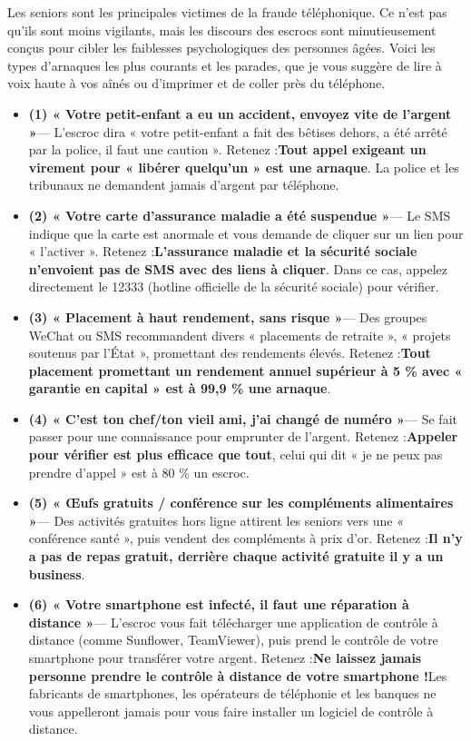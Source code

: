 
Les seniors sont les principales victimes de la fraude téléphonique. Ce n'est pas qu'ils sont moins vigilants, mais les discours des escrocs sont minutieusement conçus pour cibler les faiblesses psychologiques des personnes âgées. Voici les types d'arnaques les plus courants et les parades, que je vous suggère de lire à voix haute à vos aînés ou d'imprimer et de coller près du téléphone.


\begin{itemize}
  \item \textbf{(1) « Votre petit-enfant a eu un accident, envoyez vite de l'argent »}— L'escroc dira « votre petit-enfant a fait des bêtises dehors, a été arrêté par la police, il faut une caution ». Retenez :\textbf{Tout appel exigeant un virement pour « libérer quelqu'un » est une arnaque}. La police et les tribunaux ne demandent jamais d'argent par téléphone.
  \item \textbf{(2) « Votre carte d'assurance maladie a été suspendue »}— Le SMS indique que la carte est anormale et vous demande de cliquer sur un lien pour « l'activer ». Retenez :\textbf{L'assurance maladie et la sécurité sociale n'envoient pas de SMS avec des liens à cliquer}. Dans ce cas, appelez directement le 12333 (hotline officielle de la sécurité sociale) pour vérifier.
  \item \textbf{(3) « Placement à haut rendement, sans risque »}— Des groupes WeChat ou SMS recommandent divers « placements de retraite », « projets soutenus par l'État », promettant des rendements élevés. Retenez :\textbf{Tout placement promettant un rendement annuel supérieur à 5 \% avec « garantie en capital » est à 99,9 \% une arnaque}.
  \item \textbf{(4) « C'est ton chef/ton vieil ami, j'ai changé de numéro »}— Se fait passer pour une connaissance pour emprunter de l'argent. Retenez :\textbf{Appeler pour vérifier est plus efficace que tout}, celui qui dit « je ne peux pas prendre d'appel » est à 80 \% un escroc.
  \item \textbf{(5) « Œufs gratuits / conférence sur les compléments alimentaires »}— Des activités gratuites hors ligne attirent les seniors vers une « conférence santé », puis vendent des compléments à prix d'or. Retenez :\textbf{Il n'y a pas de repas gratuit, derrière chaque activité gratuite il y a un business}.
  \item \textbf{(6) « Votre smartphone est infecté, il faut une réparation à distance »}— L'escroc vous fait télécharger une application de contrôle à distance (comme Sunflower, TeamViewer), puis prend le contrôle de votre smartphone pour transférer votre argent. Retenez :\textbf{Ne laissez jamais personne prendre le contrôle à distance de votre smartphone !}Les fabricants de smartphones, les opérateurs de téléphonie et les banques ne vous appelleront jamais pour vous faire installer un logiciel de contrôle à distance.
\end{itemize}

